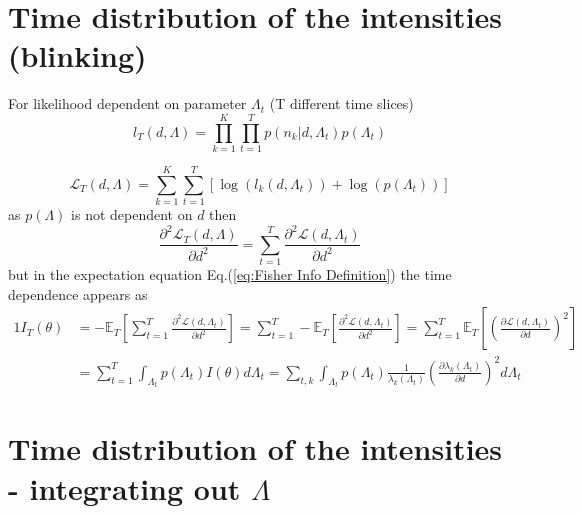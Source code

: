 \section{Time distribution of the intensities (blinking)\label{sub:Appendix: Time-distribution - Cheating}}

For likelihood dependent on parameter $\Lambda_{t}$ (T different time slices)
%
\begin{equation}
	l_{T}(d,\Lambda)=\prod_{k=1}^{K}\prod_{t=1}^{T}p(n_{k}|d,\Lambda_{t})p(\Lambda_{t})
\end{equation}

\begin{equation}
	\mathcal{L}_{T}(d,\Lambda)=\sum_{k=1}^{K}\sum_{t=1}^{T}\left[\log\left(l_{k}(d,\Lambda_{t})\right)+\log\left(p(\Lambda_{t})\right)\right]
\end{equation}
%
as $p(\Lambda)$ is not dependent on $d$ then
%
\begin{equation}
	\frac{\partial^{2}\mathcal{L}_{T}(d,\Lambda)}{\partial d^{2}}=\sum_{t=1}^{T}\frac{\partial^{2}\mathcal{L}(d,\Lambda_{t})}{\partial d^{2}}
\end{equation}
%
but in the expectation equation Eq.(\ref{eq:Fisher Info Definition}) the time dependence appears as
%
\begin{alignat*}{1}
	I_{T}(\theta) & =-\mathbb{E}_{T}\left[\sum_{t=1}^{T}\frac{\partial^{2}\mathcal{L}(d,\Lambda_{t})}{\partial d^{2}}\right]=\sum_{t=1}^{T}-\mathbb{E}_{T}\left[\frac{\partial^{2}\mathcal{L}(d,\Lambda_{t})}{\partial d^{2}}\right]=\sum_{t=1}^{T}\mathbb{E}_{T}\left[\left(\frac{\partial\mathcal{L}(d,\Lambda_{t})}{\partial d}\right)^{2}\right]\\
	 & =\sum_{t=1}^{T}\int_{\Lambda_{t}}p(\Lambda_{t})I(\theta)d\Lambda_{t}=\sum_{t,k}\int_{\Lambda_{t}}p(\Lambda_{t})\frac{1}{\lambda_{k}(\Lambda_{t})}\left(\frac{\partial\lambda_{k}(\Lambda_{t})}{\partial d}\right)^{2}d\Lambda_{t}
\end{alignat*}

\section{Time distribution of the intensities - integrating out $\Lambda$\label{sub:Appendix Time-distribution-Integrating out}}

